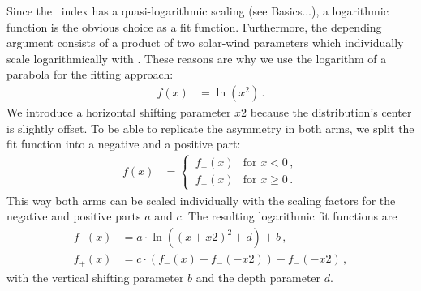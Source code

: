 Since the \Kp~index has a quasi-logarithmic scaling (see Basics...), a logarithmic function is the obvious choice as a fit function. Furthermore, the depending argument consists of a product of two solar-wind parameters which individually scale logarithmically with \Kp{}. These reasons are why we use the logarithm of a parabola for the fitting approach:
\begin{align}
	f(x) &= \ln(x^2)	\,.	\label{eq:log_square_function}
\end{align}
We introduce a horizontal shifting parameter $x2$ because the distribution's center is slightly offset. To be able to replicate the asymmetry in both arms, we split the fit function into a negative and a positive part:
\begin{align}
	f(x) &=
	\begin{cases}
		\,f_-(x) &\text{for } x < 0	\,,\\
		\,f_+(x) &\text{for } x \ge 0	\,.
	\end{cases}	\label{eq:log_square_fit_function}
\end{align}
This way both arms can be scaled individually with the scaling factors for the negative and positive parts $a$ and $c$. The resulting logarithmic fit functions are
\begin{align}
	f_-(x) &= a \cdot \ln((x + x2)^2 + d) + b	\,,\\
	f_+(x) &= c \cdot (f_-(x) - f_-(-x2)) + f_-(-x2)	\,,
\end{align}
with the vertical shifting parameter $b$ and the depth parameter $d$.\\

